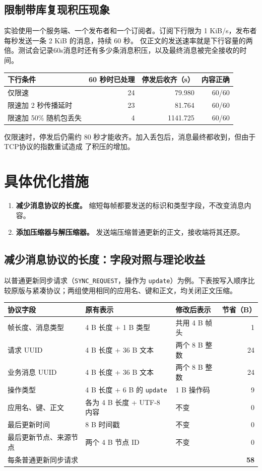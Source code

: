 \documentclass[UTF8,a4paper,11pt,fontset=fandol]{ctexart}
\newcommand{\code}[1]{\nolinkurl{#1}}
\begin{document}
\subsection{限制带库复现积压现象}
实验使用一个服务端、一个发布者和一个订阅者。订阅下行限为 1 KiB/s，发布者每秒发送一条 2 KiB 的消息，持续 60 秒。
仅正文的发送速率就是下行容量的两倍。测试会记录60s消息时还有多少条消息积压，以及最终消息被完全接收的时间。

\begin{center}\begin{tabular}{lrrr}\toprule
下行条件 & 60 秒时已处理 & 停发后收齐（s） & 内容正确\\\midrule
仅限速 & 24 & 79.980 & 60/60\\
限速加 2 秒传播延时 & 23 & 81.764 & 60/60\\
限速加 50\% 随机包丢失 & 4 & 1141.725 & 60/60\\\bottomrule
\end{tabular}\end{center}

仅限速时，停发后仍需约 80 秒才能收齐。加入丢包后，消息最终都收到，但由于TCP协议的指数重试造成
了积压的增加。

\section{具体优化措施}
\begin{enumerate}
\item \textbf{减少消息协议的长度。} 缩短每帧都要发送的标识和类型字段，不改变消息内容。
\item \textbf{添加压缩器与解压缩器。} 发送端压缩普通更新的正文，接收端将其还原。
\end{enumerate}

\newpage
\subsection{减少消息协议的长度：字段对照与理论收益}
以普通更新同步请求（\code{SYNC_REQUEST}，操作为 \code{update}）为例。下表按写入顺序比较原版与紧凑协议；两组使用相同的应用名、键和正文，均关闭正文压缩。

\begin{center}\small
\begin{tabularx}{\linewidth}{@{}lYYr@{}}\toprule
协议字段 & 原有表示 & 修改后表示 & 节省（B）\\\midrule
帧长度、消息类型 & 4 B 长度 + 1 B 类型 & 共用 4 B 帧头 & 1\\
请求 UUID & 4 B 长度 + 36 B 文本 & 两个 8 B 整数 & 24\\
业务消息 UUID & 4 B 长度 + 36 B 文本 & 两个 8 B 整数 & 24\\
操作类型 & 4 B 长度 + 6 B 的 \code{update} & 1 B 操作码 & 9\\
应用名、键、正文 & 各为 4 B 长度 + UTF-8 内容 & 不变 & 0\\
最后更新时间 & 8 B 时间戳 & 不变 & 0\\
最后更新节点、来源节点 & 两个 4 B 节点 ID & 不变 & 0\\\midrule
每条普通更新同步请求 & & & \textbf{58}\\\bottomrule
\end{tabularx}\end{center}
\end{document}
